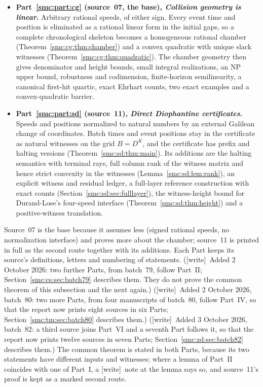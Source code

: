 \documentclass[11pt,letterpaper]{article}
\numberwithin{equation}{section}
\theoremstyle{definition}
\theoremstyle{remark}
\newcommand{\wtag}{\textup{[write]}}
\begin{document}
\begin{itemize}
\item \textbf{Part~\ref{smc:part:cg} (source~07, the base), \emph{Collision geometry is linear}.} Arbitrary rational speeds, of either sign. Every event time and position is eliminated as a rational linear form in the initial gaps, so a complete chronological skeleton becomes a homogeneous rational chamber (Theorem~\ref{smc:cg:thm:chamber}) and a convex quadratic with unique slack witnesses (Theorem~\ref{smc:cg:thm:quadratic}). The chamber geometry then gives denominator and height bounds, small integral realizations, an NP upper bound, robustness and codimension, finite-horizon semilinearity, a canonical first-hit quartic, exact Ehrhart counts, two exact examples and a convex-quadratic barrier.
\item \textbf{Part~\ref{smc:part:sd} (source~11), \emph{Direct Diophantine certificates}.} Speeds and positions normalized to natural numbers by an external Galilean change of coordinates. Batch times and event positions stay in the certificate as natural witnesses on the grid $B=D^K$, and the certificate has prefix and halting versions (Theorem~\ref{smc:sd:thm:main}). Its additions are the halting semantics with terminal rays, full column rank of the witness matrix and hence strict convexity in the witnesses (Lemma~\ref{smc:sd:lem:rank}), an explicit witness and residual ledger, a full-layer reference construction with exact counts (Section~\ref{smc:sd:sec:fulllayer}), the witness-height bound for Durand-Lose's four-speed interface (Theorem~\ref{smc:sd:thm:height}) and a positive-witness translation.
\end{itemize}

Source~07 is the base because it assumes less (signed rational speeds, no normalization interface) and proves more about the chamber; source~11 is printed in full as the second route together with its additions. Each Part keeps its source's definitions, letters and numbering of statements. (\wtag\ Added 2 October 2026: two further Parts, from batch~79, follow Part~II; Section~\ref{smc:cs:sec:batch79} describes them. They do not prove the common theorem of this subsection and the next again.) (\wtag\ Added 2 October 2026, batch~80: two more Parts, from four manuscripts of batch~80, follow Part~IV, so that the report now prints eight sources in six Parts; Section~\ref{smc:tm:sec:batch80} describes them.) (\wtag\ Added 3 October 2026, batch~82: a third source joins Part~VI and a seventh Part follows it, so that the report now prints twelve sources in seven Parts; Section~\ref{smc:zd:sec:batch82} describes them.) The common theorem is stated in both Parts, because its two statements have different inputs and witnesses; where a lemma of Part~II coincides with one of Part~I, a \wtag\ note at the lemma says so, and source~11's proof is kept as a marked second route.
\end{document}
